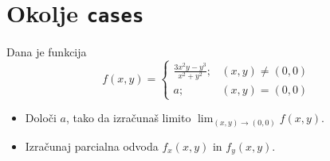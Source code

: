 \documentclass[a4paper,12pt]{article}
\begin{document}
\section*{Okolje \texttt{cases}}
Dana je funkcija
\begin{equation*}
 f(x, y) =
\begin{cases}
   \frac{3x^2y-y^3}{x^2+y^2}; &(x, y) \neq (0,0)\\
      a; &(x, y) = (0, 0)
\end{cases} 
\end{equation*}
\begin{itemize}
\item Določi \(a\), tako da izračunaš limito \( \lim_{(x,y)\to(0,0)} f(x,y) \).
\item Izračunaj parcialna odvoda \(f_x(x,y)\) in \(f_y(x,y)\).
\end{itemize}
\end{document}

